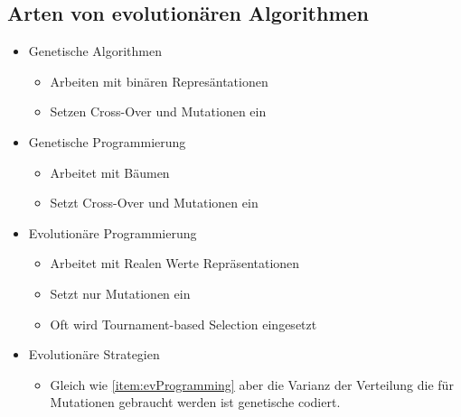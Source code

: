     \subsection{Arten von evolutionären Algorithmen}
    \label{sub:artenEvAlgos}
      \begin{itemize}
        \item Genetische Algorithmen
          \begin{itemize}
            \item Arbeiten mit binären Represäntationen
            \item Setzen Cross-Over und Mutationen ein
          \end{itemize}
        \item Genetische Programmierung
          \begin{itemize}
            \item Arbeitet mit Bäumen
            \item Setzt Cross-Over und Mutationen ein
          \end{itemize}
        \item Evolutionäre Programmierung
        \label{item:evProgramming}
          \begin{itemize}
            \item Arbeitet mit Realen Werte Repräsentationen
            \item Setzt nur Mutationen ein
            \item Oft wird Tournament-based Selection eingesetzt
          \end{itemize}
        \item Evolutionäre Strategien
          \begin{itemize}
            \item Gleich wie \ref{item:evProgramming} aber die Varianz der Verteilung die für Mutationen gebraucht werden ist genetische codiert.
          \end{itemize}
      \end{itemize}
